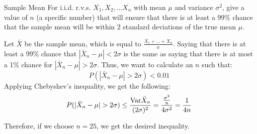 \documentclass[11.5pt]{article}
\begin{document}
\begin{comment}
For convenience, let $M(t) = \frac{\lambda}{\lambda - t}$. Then, using LOTUS, we get: 

\begin{align*}
&  E\left( \pfrac{\lambda}{\lambda - t}^N \right) \\ &=\sum_{n = 1}^\infty M(t)^n \cdot P(N = n) \\ &= \sum_{n = 1}^\infty pq^{n-1} M(t)^n \\ &= 
\frac{p}{q} \sum_{n = 1}^\infty (q M(t))^n \\ 
&=\frac{p}{q} \cdot \frac{qM(t)}{1 - qM(t)} \\ 
&=\frac{p}{q} \cdot \frac{q \cdot \frac{\lambda}{\lambda - t}}{ 1  - q \cdot \frac{\lambda}{\lambda - t}} \\ 
&=\frac{p\lambda}{p \lambda - t}
\end{align*}

The sum was removed above by the sum of an infinite geometric series.

This MGF gives us: $X \sim \Expo(p \lambda)$, which agrees with the mean and variance we found above!  

\end{enumerate}
\end{solution}

\end{comment}

\begin{exercise}{Sample Mean}
For i.i.d. r.v.s. $X_1, X_2, \ldots X_n$ with mean $\mu$ and variance $\sigma^2$, give a value of $n$ (a specific number) that will ensure that there is at least a 99\% chance that the sample mean will be within 2 standard deviations of the true mean $\mu$. 
\end{exercise}

\begin{solution}{3}
Let $\bar{X}$ be the sample mean, which is equal to $\frac{X_1 + \ldots + X_n}{n}$. Saying that there is at least a 99\% chance that $|\bar{X}_n - \mu| < 2 \sigma$ is the same as saying that there is at most a 1\% chance for $|\bar{X}_n - \mu| > 2 \sigma$. Thus, we want to calculate an $n$ such that: 
$$P\left( |\bar{X}_n - \mu | > 2 \sigma \right) < 0.01$$
Applying Chebyshev's inequality, we get the following: 
$$P(|\bar{X}_n - \mu| > 2 \sigma) \leq \frac{\textrm{Var} \bar{X}_n}{(2 \sigma)^2} = \frac{\frac{\sigma^2}{n}}{4 \sigma^2} = \frac{1}{4n}$$

Therefore, if we choose $n = 25$, we get the desired inequality. 
\end{solution}
\end{document}
